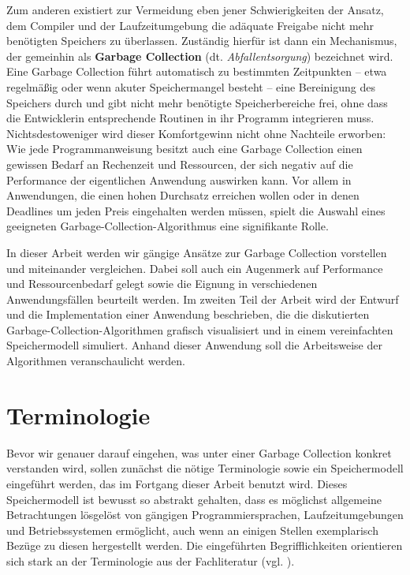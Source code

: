Zum anderen existiert zur Vermeidung eben jener Schwierigkeiten der Ansatz, dem Compiler und der Laufzeitumgebung die adäquate Freigabe nicht mehr benötigten Speichers zu überlassen.
Zuständig hierfür ist dann ein Mechanismus, der gemeinhin als \textbf{Garbage Collection} (dt. \textit{Abfallentsorgung}) bezeichnet wird.
Eine Garbage Collection führt automatisch zu bestimmten Zeitpunkten -- etwa regelmäßig oder wenn akuter Speichermangel besteht -- eine Bereinigung des Speichers durch und gibt nicht mehr benötigte Speicherbereiche frei, ohne dass die Entwicklerin entsprechende Routinen in ihr Programm integrieren muss.
Nichtsdestoweniger wird dieser Komfortgewinn nicht ohne Nachteile erworben:
Wie jede Programmanweisung besitzt auch eine Garbage Collection einen gewissen Bedarf an Rechenzeit und Ressourcen, der sich negativ auf die Performance der eigentlichen Anwendung auswirken kann.
Vor allem in Anwendungen, die einen hohen Durchsatz erreichen wollen oder in denen Deadlines um jeden Preis eingehalten werden müssen, spielt die Auswahl eines geeigneten Garbage-Collection-Algorithmus eine signifikante Rolle.

In dieser Arbeit werden wir gängige Ansätze zur Garbage Collection vorstellen und miteinander vergleichen.
Dabei soll auch ein Augenmerk auf Performance und Ressourcenbedarf gelegt sowie die Eignung in verschiedenen Anwendungsfällen beurteilt werden.
Im zweiten Teil der Arbeit wird der Entwurf und die Implementation einer Anwendung beschrieben, die die diskutierten Garbage-Collection-Algorithmen grafisch visualisiert und in einem vereinfachten Speichermodell simuliert.
Anhand dieser Anwendung soll die Arbeitsweise der Algorithmen veranschaulicht werden.

\section{Terminologie}
\label{sec:intro:terminologie}
Bevor wir genauer darauf eingehen, was unter einer Garbage Collection konkret verstanden wird, sollen zunächst die nötige Terminologie sowie ein Speichermodell eingeführt werden, das im Fortgang dieser Arbeit benutzt wird.
Dieses Speichermodell ist bewusst so abstrakt gehalten, dass es möglichst allgemeine Betrachtungen lösgelöst von gängigen Programmiersprachen, Laufzeitumgebungen und Betriebssystemen ermöglicht, auch wenn an einigen Stellen exemplarisch Bezüge zu diesen hergestellt werden.
Die eingeführten Begrifflichkeiten orientieren sich stark an der Terminologie aus der Fachliteratur (vgl. \cite[Kap. 1]{jones-lins}).

